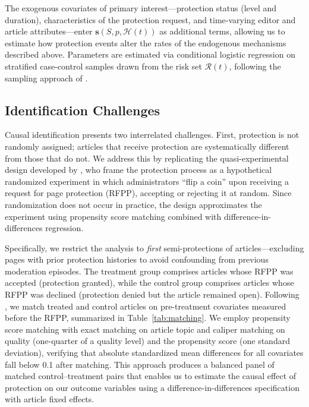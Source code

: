 \documentclass[11pt]{article}
\begin{document}
\noindent The exogenous covariates of primary interest---protection status (level and duration), characteristics of the protection request, and time-varying editor and article attributes---enter $\mathbf{s}(S, p, \mathcal{H}(t))$ as additional terms, allowing us to estimate how protection events alter the rates of the endogenous mechanisms described above. Parameters are estimated via conditional logistic regression on stratified case-control samples drawn from the risk set $\mathcal{R}(t)$, following the sampling approach of \citet{Lerner2020}.

\FloatBarrier
\subsection{Identification Challenges}

Causal identification presents two interrelated challenges. First, protection is not randomly assigned; articles that receive protection are systematically different from those that do not. We address this by replicating the quasi-experimental design developed by \citet{Ruprechter2025}, who frame the protection process as a hypothetical randomized experiment in which administrators ``flip a coin'' upon receiving a request for page protection (RFPP), accepting or rejecting it at random. Since randomization does not occur in practice, the design approximates the experiment using propensity score matching combined with difference-in-differences regression.

Specifically, we restrict the analysis to \emph{first} semi-protections of articles---excluding pages with prior protection histories to avoid confounding from previous moderation episodes. The treatment group comprises articles whose RFPP was accepted (protection granted), while the control group comprises articles whose RFPP was declined (protection denied but the article remained open). Following \citet{Ruprechter2025}, we match treated and control articles on pre-treatment covariates measured before the RFPP, summarized in Table~\ref{tab:matching}. We employ propensity score matching with exact matching on article topic and caliper matching on quality (one-quarter of a quality level) and the propensity score (one standard deviation), verifying that absolute standardized mean differences for all covariates fall below 0.1 after matching. This approach produces a balanced panel of matched control--treatment pairs that enables us to estimate the causal effect of protection on our outcome variables using a difference-in-differences specification with article fixed effects.
\end{document}
